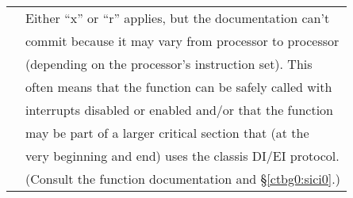 \begin{table}
\begin{center}
\begin{tabular}{|l|l|}
              & Either ``x'' or ``r'' applies, but the documentation can't       \\
              & commit because it may vary from processor to processor           \\
              & (depending on the processor's instruction set).  This            \\
              & often means that the function can be safely called with          \\
              & interrupts disabled or enabled and/or that the function          \\
              & may be part of a larger critical section that (at the            \\
              & very beginning and end) uses the classis DI/EI protocol.         \\
              & (Consult the function documentation and \S{}\ref{ctbg0:sici0}.)  \\
\hline
\end{tabular}
\end{center}
\end{table}

